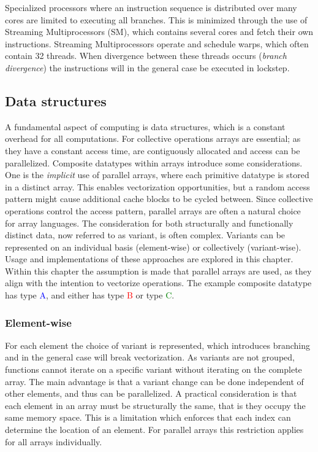 \documentclass{article}
\begin{document}
Specialized processors where an instruction sequence is distributed over many cores are limited to executing all branches.
This is minimized through the use of Streaming Multiprocessors (SM), which contains several cores and fetch their own instructions.
Streaming Multiprocessors operate and schedule warps, which often contain 32 threads.
When divergence between these threads occurs ({\it branch divergence}) the instructions will in the general case be executed in lockstep\cite{threads-independent-scheduling}.

\newpage

\subsection{Data structures}

A fundamental aspect of computing is data structures, which is a constant overhead for all computations.
For collective operations arrays are essential; as they have a constant access time, are contiguously allocated and access can be parallelized.
Composite datatypes within arrays introduce some considerations.
One is the {\it implicit} use of parallel arrays, where each primitive datatype is stored in a distinct array.
This enables vectorization opportunities, but a random access pattern might cause additional cache blocks to be cycled between.
Since collective operations control the access pattern, parallel arrays are often a natural choice for array languages.
The consideration for both structurally and functionally distinct data, now referred to as variant, is often complex.
Variants can be represented on an individual basis (element-wise) or collectively (variant-wise).
Usage and implementations of these approaches are explored in this chapter. 
Within this chapter the assumption is made that parallel arrays are used, as they align with the intention to vectorize operations. 
The example composite datatype has type \textcolor{blue}{A}, and either has type \textcolor{red}{B} or type \textcolor{green}{C}.

\subsubsection{Element-wise}

For each element the choice of variant is represented, which introduces branching and in the general case will break vectorization.
As variants are not grouped, functions cannot iterate on a specific variant without iterating on the complete array.
The main advantage is that a variant change can be done independent of other elements, and thus can be parallelized.
A practical consideration is that each element in an array must be structurally the same, that is they occupy the same memory space.
This is a limitation which enforces that each index can determine the location of an element. 
For parallel arrays this restriction applies for all arrays individually\cite{accelerate-sum-types}.
\end{document}
